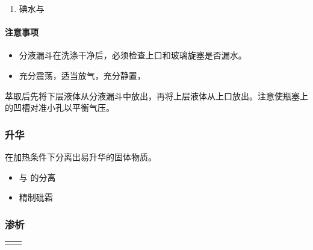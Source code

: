 \documentclass[10pt]{article}
\begin{document}
	\begin{enumerate}
		\item 碘水与 \ce{}	
	\end{enumerate}
	
	\paragraph{注意事项}
	
	\begin{itemize}
		\item 分液漏斗在洗涤干净后，必须检查上口和玻璃旋塞是否漏水。
		\item 充分震荡，适当放气，充分静置，
	\end{itemize}

	萃取后先将下层液体从分液漏斗中放出，再将上层液体从上口放出。注意使瓶塞上的凹槽对准小孔以平衡气压。
	
	\subsubsection{升华}
	
	在加热条件下分离出易升华的固体物质。
	
	\begin{itemize}
		\item {}与 的分离
		\item 精制砒霜
	\end{itemize}
	
	
	\subsubsection{渗析}
	
	\begin{center}
	\tablelasttail{\hline}
	\begin{supertabular}{|m{0.5\textwidth}<{ \centering}|m{0.5\textwidth}<{ \centering}|}
		\hline
		& \\ \hline
		& \\
	\end{supertabular}
	\end{center}
	
\end{document}
